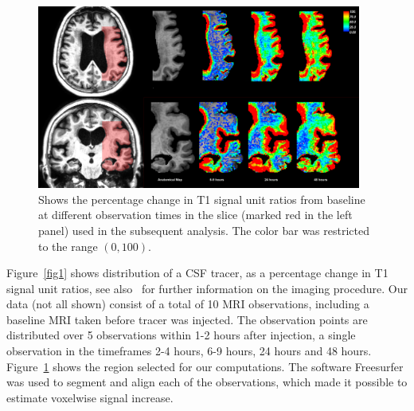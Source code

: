 \documentclass[11pt,a4paper]{article}
\begin{document}
\begin{figure}
\includegraphics[width=0.95\textwidth]{Zoom-PatID-68.png} 
\caption{Shows the percentage change in T1 signal unit ratios from baseline at different observation times in the slice (marked red in the left panel) used in the subsequent analysis. The color bar was restricted to the range $(0,100)$. }
\label{fig2} 
\end{figure}
Figure~\ref{fig1} shows distribution of a CSF tracer, as a percentage change in T1 signal unit ratios, see also~\cite{ringstad2018brain} for further information on the imaging procedure.   
Our data (not all shown) consist of a total of 10 MRI observations, including a baseline MRI taken before tracer was injected. The observation points are distributed over 5 observations within 1-2 hours after injection, a single observation in the timeframes 2-4 hours, 6-9 hours, 24 hours and 48 hours. 
Figure~\ref{fig2} shows the region selected for our computations. 
The software Freesurfer \cite{Dale1999179, FischlLiuDale, spf2007, reuter:robreg10} was used to segment and align each of the observations, which made it possible to estimate voxelwise signal increase. 

\end{document}
